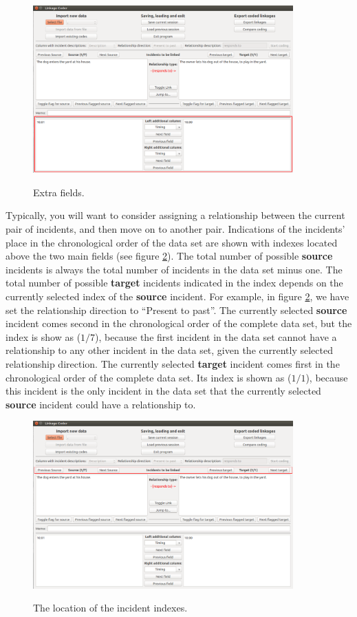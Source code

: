 \documentclass{memoir}
\begin{document}
\begin{figure}[h!]
  \centering
  \caption{Extra fields.}
  \includegraphics[width=100mm]{Screenshot_6.pdf}
  \label{fig:extrafields}
\end{figure}

Typically, you will want to consider assigning a relationship between the current pair of incidents, and then move on to another pair. Indications of the incidents' place in the chronological order of the data set are shown with indexes located above the two main fields (see figure \ref{fig:indexes}). The total number of possible \textbf{source} incidents is always the total number of incidents in the data set minus one. The total number of possible \textbf{target} incidents indicated in the index depends on the currently selected index of the \textbf{source} incident. For example, in figure \ref{fig:indexes}, we have set the relationship direction to ``Present to past''. The currently selected \textbf{source} incident comes second in the chronological order of the complete data set, but the index is show as (\(1 / 7\)), because the first incident in the data set cannot have a relationship to any other incident in the data set, given the currently selected relationship direction. The currently selected \textbf{target} incident comes first in the chronological order of the complete data set. Its index is shown as (\(1 / 1\)), because this incident is the only incident in the data set that the currently selected \textbf{source} incident could have a relationship to.    

\begin{figure}[h!]
  \centering
  \caption{The location of the incident indexes.}
  \includegraphics[width=100mm]{Screenshot_7.pdf}
  \label{fig:indexes}
\end{figure}
\end{document}
